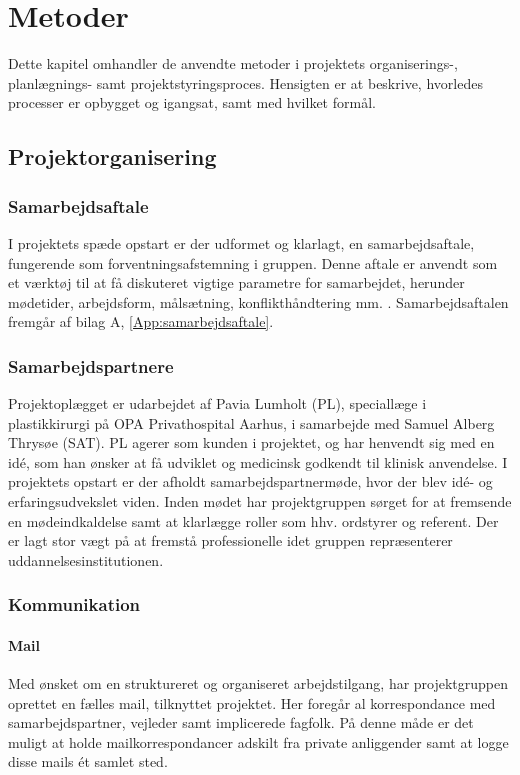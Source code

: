 \chapter{Metoder}

Dette kapitel omhandler de anvendte metoder i projektets organiserings-, planlægnings-  samt projektstyringsproces. Hensigten er at beskrive, hvorledes processer er opbygget og igangsat, samt med hvilket formål.  

\section{Projektorganisering}
\subsection{Samarbejdsaftale}
I projektets spæde opstart er der udformet og klarlagt, en samarbejdsaftale, fungerende som forventningsafstemning i gruppen. Denne aftale er anvendt som et værktøj til at få diskuteret vigtige parametre for samarbejdet, herunder mødetider, arbejdsform, målsætning, konflikthåndtering mm. \citep{RefWorks:12}. Samarbejdsaftalen fremgår af bilag A, \ref{App:samarbejdsaftale}. 

\subsection{Samarbejdspartnere}
	Projektoplægget er udarbejdet af Pavia Lumholt (PL), speciallæge i plastikkirurgi på OPA Privathospital Aarhus, i samarbejde med Samuel Alberg Thrysøe (SAT). PL agerer som kunden i projektet, og har henvendt sig med en idé, som han ønsker at få udviklet og medicinsk godkendt til klinisk anvendelse. I projektets opstart er der afholdt samarbejdspartnermøde, hvor der blev idé- og erfaringsudvekslet viden. Inden mødet har projektgruppen sørget for at fremsende en mødeindkaldelse samt at klarlægge roller som hhv. ordstyrer og referent. Der er lagt stor vægt på at fremstå professionelle idet gruppen repræsenterer uddannelsesinstitutionen. 
	
	\subsection{Kommunikation}

	\subsubsection{Mail}
	Med ønsket om en struktureret og organiseret arbejdstilgang, har projektgruppen oprettet en fælles mail, tilknyttet projektet. Her foregår al korrespondance med samarbejdspartner, vejleder samt implicerede fagfolk. På denne måde er det muligt at holde mailkorrespondancer adskilt fra private anliggender samt at logge disse mails ét samlet sted. 
	
